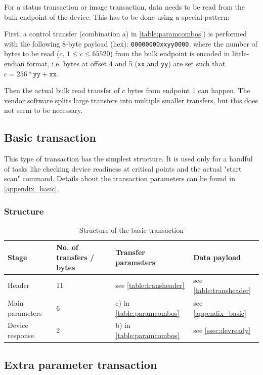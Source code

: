 \documentclass{article}
\begin{document}
For a status transaction or image transaction, data needs to be read from the bulk endpoint of the device.
This has to be done using a special pattern:

First, a control transfer (combination a) in \autoref{table:paramcombos}) is
performed with the following 8-byte payload (hex): {\tt 00000000xxyy0000},
where the number of bytes to be read ($c$, $1 \leq c \leq 65520$) from the bulk endpoint is encoded
in little-endian format, i.e. bytes at offset 4 and 5 ({\tt xx} and {\tt yy}) are set such that
$c = 256 * \texttt{yy} + \texttt{xx}$.

Then the actual bulk read transfer of $c$ bytes from endpoint 1 can happen. The vendor software
splits large transfers into multiple smaller transfers, but this does not seem
to be necessary.

\subsection{Basic transaction}
\label{ssec:basic_trans}

This type of transaction has the simplest structure. It is used only for a handful of tasks like
checking device readiness at critical points and the actual "start scan" command.
Details about the transaction parameters can be found in \autoref{appendix_basic}.

\subsubsection{Structure}

\begin{table}[H]
  \caption{Structure of the basic transaction}
  \centering
  \begin{tabularx}{\textwidth}{X | X | X | X}
    Stage & No. of transfers / bytes & Transfer parameters & Data payload \\ \hline
    
    Header & 11 & see \autoref{table:transheader} & see \autoref{table:transheader} \\
    Main parameters & 6 & c) in \autoref{table:paramcombos} & see \autoref{appendix_basic} \\
    Device response & 2 & b) in \autoref{table:paramcombos} & see \autoref{ssec:devready} \\
  \end{tabularx}
\end{table}


\subsection{Extra parameter transaction}
\end{document}
